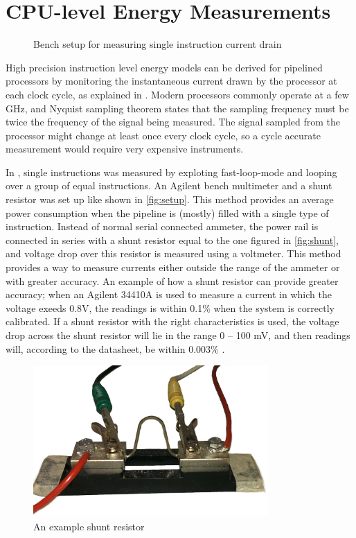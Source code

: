 \section{CPU-level Energy Measurements}
\label{sec:energymeasure}

\begin{figure}[tbh]
    \centering
    
    \caption{Bench setup for measuring single instruction current drain}
    \label{fig:setup}
\end{figure}

High precision instruction level energy models can be derived for pipelined
processors by monitoring the instantaneous current drawn by the processor at
each clock cycle, as explained in \cite{nikolaidis2005instruction}. Modern
processors commonly operate at a few GHz, and Nyquist sampling theorem
\cite{nyquist1928certain} states that the sampling frequency must be twice the
frequency of the signal being measured. The signal sampled from the processor
might change at least once every clock cycle, so a cycle accurate measurement
would require very expensive instruments.

In \cite{rundehvatum2013exploring}, single instructions was measured by
exploting fast-loop-mode and looping over a group of equal instructions. An
Agilent bench multimeter and a shunt resistor was set up like shown in
\autoref{fig:setup}. This method provides an average power consumption when the
pipeline is (mostly) filled with a single type of instruction. Instead of normal
serial connected ammeter, the power rail is connected in series with a shunt
resistor equal to the one figured in \autoref{fig:shunt}, and voltage drop over
this resistor is measured using a voltmeter. This method provides a way to
measure currents either outside the range of the ammeter or with greater
accuracy. An example of how a shunt resistor can provide greater accuracy; when
an Agilent 34410A is used to measure a current in which the voltage exeeds 0.8V,
the readings is within 0.1\% when the system is correctly calibrated. If a shunt
resistor with the right characteristics is used, the voltage drop across the
shunt resistor will lie in the range 0 -- 100 mV, and then readings will,
according to the datasheet, be within 0.003\% \cite{agilent34410a}.

\begin{figure}[tbh]
    \centering
    \includegraphics[width=0.8\textwidth]{figs/shunt.jpg}
    \caption{An example shunt resistor}
    \label{fig:shunt}
\end{figure}


